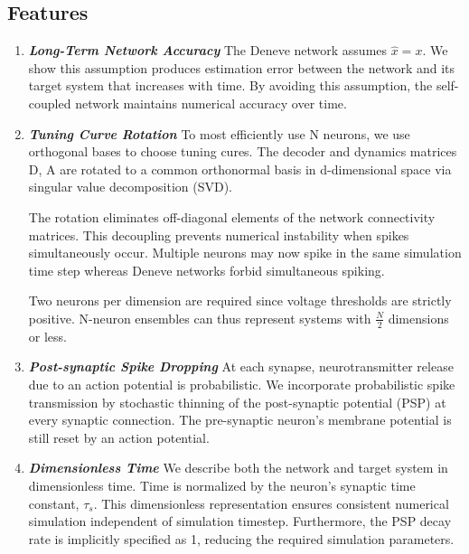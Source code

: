 \subsection{Features}
\begin{enumerate}
    \item \textbf{\textit{Long-Term Network Accuracy}} The Deneve network assumes $\hat{x}=x$. We show this assumption produces estimation error between the network and its target system that increases with time. By avoiding this assumption, the self-coupled network maintains numerical accuracy over time. 
    
    \item \textbf{\textit{Tuning Curve Rotation}} To most efficiently use N neurons, we use orthogonal bases to choose tuning cures. The decoder and dynamics matrices D, A are rotated to a common orthonormal basis in d-dimensional space via singular value decomposition (SVD).

    The rotation eliminates off-diagonal elements of the network connectivity matrices.  This decoupling prevents numerical instability when spikes simultaneously occur.  Multiple neurons may now spike in the same simulation time step whereas Deneve networks forbid simultaneous spiking.  
    
    Two neurons per dimension are required since voltage thresholds are strictly positive.
    N-neuron ensembles can thus represent systems with $\frac{N}{2}$ dimensions or less. 
    
    \item \textbf{\textit{Post-synaptic Spike Dropping}} At each synapse, neurotransmitter release due to an action potential is probabilistic.  We incorporate probabilistic spike transmission by stochastic thinning of the post-synaptic potential (PSP) at every synaptic connection. The pre-synaptic neuron's membrane potential is still reset by an action potential. 
    
    \item \textbf{\textit{Dimensionless Time}} We describe both the network and target system in dimensionless time. Time is normalized by the neuron's synaptic time constant, $\tau_s$. This dimensionless representation ensures consistent numerical simulation independent of simulation timestep. Furthermore, the PSP decay rate is implicitly specified as 1, reducing the required simulation parameters.     
\end{enumerate}

